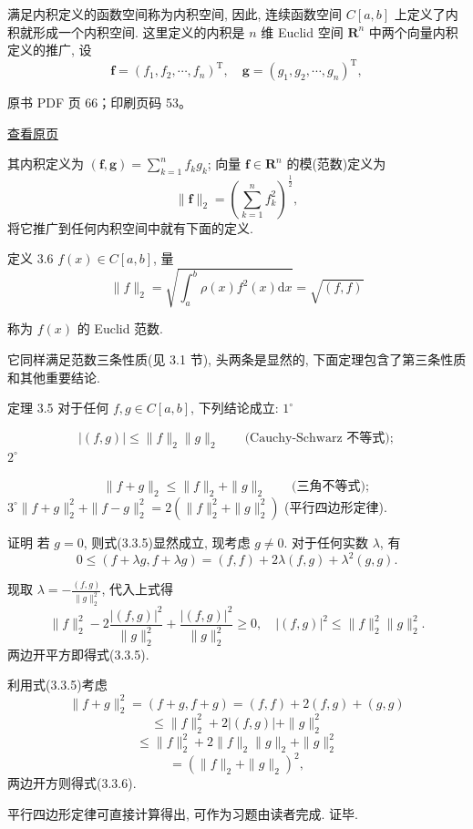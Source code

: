 满足内积定义的函数空间称为内积空间, 因此, 连续函数空间 \(C[a,b]\) 上定义了内积就形成一个内积空间. 这里定义的内积是 \(n\) 维 Euclid 空间 \(\mathbf{R}^n\) 中两个向量内积定义的推广, 设 \[
\boldsymbol{f} = (f_1, f_2, \cdots, f_n)^{\mathrm{T}}, \quad \boldsymbol{g} = (g_1, g_2, \cdots, g_n)^{\mathrm{T}},
\]

\clearpage

原书 PDF 页 66；印刷页码 53。

\href{source-images/pdf-066.jpeg}{查看原页}

其内积定义为 \((\boldsymbol{f}, \boldsymbol{g}) = \sum_{k=1}^{n} f_{k} g_{k}\); 向量 \(\boldsymbol{f} \in \mathbf{R}^{n}\) 的模(范数)定义为 \[
\| \boldsymbol{f} \|_{2} = \left( \sum_{k=1}^{n} f_{k}^{2} \right)^{\frac{1}{2}},
\] 将它推广到任何内积空间中就有下面的定义.

定义 3.6 \(f(x) \in C[a, b]\), 量 \[
\| f \|_{2} = \sqrt{\int_{a}^{b} \rho(x) f^{2}(x) \mathrm{d}x} = \sqrt{(f, f)} \tag{3.3.4}
\]

称为 \(f(x)\) 的 Euclid 范数.

它同样满足范数三条性质(见 3.1 节), 头两条是显然的, 下面定理包含了第三条性质和其他重要结论.

定理 3.5 对于任何 \(f, g \in C[a, b]\), 下列结论成立: \(1^{\circ}\)

\[
|(f,g)|\leqslant\|f\|_2\|g\|_2\qquad\text{(Cauchy-Schwarz 不等式)};\tag{3.3.5}
\] \(2^{\circ}\)

\[
\|f+g\|_2\leqslant\|f\|_2+\|g\|_2\qquad\text{(三角不等式)};\tag{3.3.6}
\] \(3^{\circ} \| f + g \|_{2}^{2} + \| f - g \|_{2}^{2} = 2(\| f \|_{2}^{2} + \| g \|_{2}^{2})\) (平行四边形定律).

证明 若 \(g=0\), 则式(3.3.5)显然成立, 现考虑 \(g \neq 0\). 对于任何实数 \(\lambda\), 有 \[
0 \leqslant (f + \lambda g, f + \lambda g) = (f, f) + 2\lambda(f, g) + \lambda^{2}(g, g).
\]

现取 \(\lambda = -\frac{(f, g)}{\| g \|_{2}^{2}}\), 代入上式得 \[
\| f \|_{2}^{2} - 2 \frac{|(f, g)|^{2}}{\| g \|_{2}^{2}} + \frac{|(f, g)|^{2}}{\| g \|_{2}^{2}} \geqslant 0, \quad |(f, g)|^{2} \leqslant \| f \|_{2}^{2} \| g \|_{2}^{2}.
\] 两边开平方即得式(3.3.5).

利用式(3.3.5)考虑 \[
\| f + g \|_{2}^{2} = (f + g, f + g) = (f, f) + 2(f, g) + (g, g)
\] \[
\leqslant \| f \|_{2}^{2} + 2 |(f, g)| + \| g \|_{2}^{2}
\] \[
\leqslant \| f \|_{2}^{2} + 2 \| f \|_{2} \| g \|_{2} + \| g \|_{2}^{2}
\] \[
= (\| f \|_{2} + \| g \|_{2})^{2},
\] 两边开方则得式(3.3.6).

平行四边形定律可直接计算得出, 可作为习题由读者完成. 证毕.


